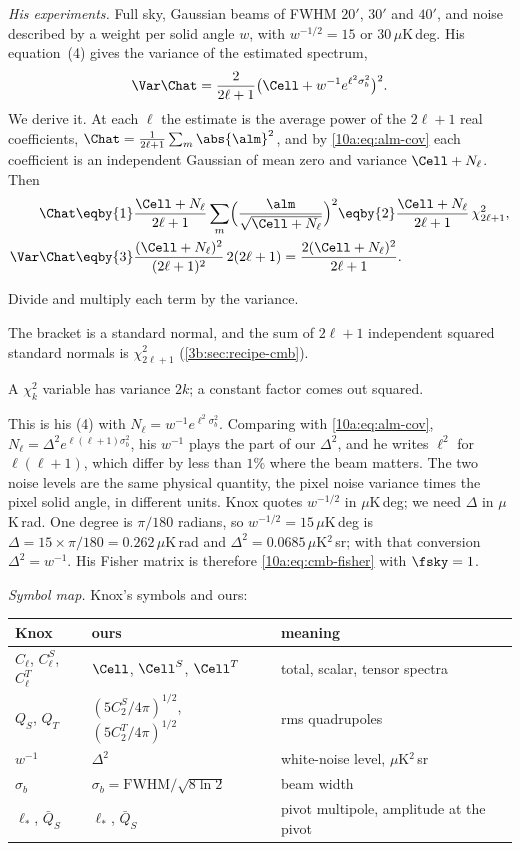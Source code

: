 \emph{His experiments.} Full sky, Gaussian beams of FWHM $20'$, $30'$ and $40'$, and noise described by a weight per
solid angle $w$, with $w^{-1/2}=15$ or $30\,\mu$K\,deg. His equation~(4) gives the variance of the estimated spectrum,
\[
  \Var\Chat=\frac2{2\ell+1}\bigl(\Cell+w^{-1}e^{\ell^2\sigma_b^2}\bigr)^2 .
\]
We derive it. At each $\ell$ the estimate is the average power of the $2\ell+1$ real coefficients,
$\Chat=\frac1{2\ell+1}\sum_m\abs{\alm}^2$, and by \eqref{10a:eq:alm-cov} each coefficient is an independent Gaussian of mean zero
and variance $\Cell+N_\ell$. Then
\begin{align*}
  \Chat
  &\eqby{1}\frac{\Cell+N_\ell}{2\ell+1}\sum_m\Bigl(\frac{\alm}{\sqrt{\Cell+N_\ell}}\Bigr)^2
   \eqby{2}\frac{\Cell+N_\ell}{2\ell+1}\,\chi^2_{2\ell+1},
  \\
  \Var\Chat&\eqby{3}\frac{(\Cell+N_\ell)^2}{(2\ell+1)^2}\,2(2\ell+1)=\frac{2(\Cell+N_\ell)^2}{2\ell+1}.
\end{align*}
\begin{explain}
  \item Divide and multiply each term by the variance.
  \item The bracket is a standard normal, and the sum of $2\ell+1$ independent squared standard normals is
        $\chi^2_{2\ell+1}$ (\cref{3b:sec:recipe-cmb}).
  \item A $\chi^2_k$ variable has variance $2k$; a constant factor comes out squared.
\end{explain}
This is his (4) with $N_\ell=w^{-1}e^{\ell^2\sigma_b^2}$. Comparing with \eqref{10a:eq:alm-cov}, $N_\ell=\Delta^2e^{\ell(\ell+1)\sigma_b^2}$, his
$w^{-1}$ plays the part of our $\Delta^2$, and he writes $\ell^2$ for $\ell(\ell+1)$, which differ by less than $1\%$ where the
beam matters. The two noise levels are the same physical quantity, the pixel noise variance times the pixel
solid angle, in different units. Knox quotes $w^{-1/2}$ in $\mu$K\,deg; we need $\Delta$ in $\mu$K\,rad. One degree is
$\pi/180$ radians, so $w^{-1/2}=15\,\mu$K\,deg is $\Delta=15\times\pi/180=0.262\,\mu$K\,rad and $\Delta^2=0.0685\,\mu$K$^2$\,sr; with
that conversion $\Delta^2=w^{-1}$. His Fisher matrix is therefore \eqref{10a:eq:cmb-fisher} with $\fsky=1$.

\emph{Symbol map.} Knox's symbols and ours:
\begin{center}
\small
\renewcommand{\arraystretch}{1.1}
\begin{tabular}{@{}lll@{}}
\toprule
Knox & ours & meaning\\\midrule
$C_\ell$, $C_\ell^S$, $C_\ell^T$ & $\Cell$, $\Cell^S$, $\Cell^T$ & total, scalar, tensor spectra\\
$Q_S$, $Q_T$ & $(5C_2^S/4\pi)^{1/2}$, $(5C_2^T/4\pi)^{1/2}$ & rms quadrupoles\\
$w^{-1}$ & $\Delta^2$ & white-noise level, $\mu$K$^2$\,sr\\
$\sigma_b$ & $\sigma_b=\mathrm{FWHM}/\sqrt{8\ln2}$ & beam width\\
$\ell_*$, $\bar Q_S$ & $\ell_*$, $\bar Q_S$ & pivot multipole, amplitude at the pivot\\
\bottomrule
\end{tabular}
\end{center}

